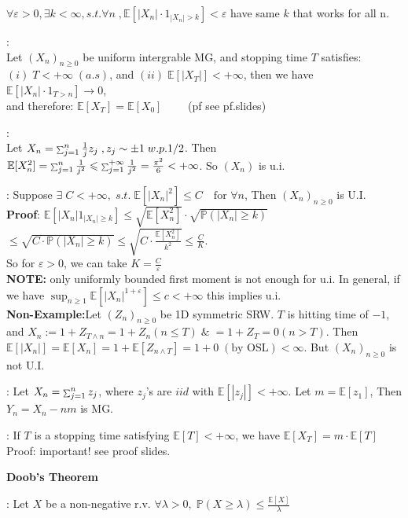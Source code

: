 \documentclass[a4paper, landscape]{article}
\newcommand{\topic}[1]{\par\medskip\textbf{#1}\par}
\newcommand{\subtopic}[1]{\par\textbf{#1}}
\newcommand{\smallsum}{\mathop{\scalebox{0.65}{$\sum$}}\nolimits}
\renewcommand{\topic}[1]{\par\medskip\noindent\colorbox{highlightcolor}{\parbox{\dimexpr\columnwidth-2\fboxsep\relax}{\textbf{#1}}}\par}
\renewcommand{\subtopic}[1]{\par\textbf{\color{blue}{#1}}} %
\begin{document}
\begin{multicols}{4}
$\forall\varepsilon>0,\exists k<\infty,s.t.\forall n\;,\mathbb E[|X_n| \cdot 1_{|X_n|>k}]<\varepsilon$ have same $k$ that works for all n.
\subtopic{Revised OST(u.i.)}:\\
Let $(X_n)_{n\geqslant0}$ be uniform intergrable MG, and stopping time $T$ satisfies: $(i)\;T<+\infty\;(a.s)$, and $(ii)\;\mathbb E[|X_T|]<+\infty$, then we have $\mathbb E[|X_n|\cdot1_{T>n}]\to 0$, \\and therefore: $\mathbb E[X_T]=\mathbb E[X_0]\qquad$ (pf see pf.slides)\\
\subtopic{An example of u.i.}:\\
Let $X_n=\smallsum_{j=1}^{n}\frac{1}{j}z_j\;,z_j\sim\pm1\;w.p.1/2$. Then $\mathbb E[X_n^2]=\smallsum_{j=1}^n\frac{1}{j^2}\leqslant\smallsum_{j=1}^{+\infty}\frac{1}{j^2}=\frac{\pi^2}{6}<+\infty$. So $(X_n)$ is u.i.
\subtopic{Equivalence U.I.}: Suppose $\exists\;C<+\infty,\;s.t.\; \mathbb E[|X_n|^2]\leqslant C\quad \text{for }\forall n$, Then $(X_n)_{n\geqslant0}$ is U.I.\\
\textbf{Proof}: $\mathbb E[|X_n|1_{|X_n|\geqslant k}]\leqslant\sqrt{\mathbb E[X_n^2]}\cdot\sqrt{\mathbb P(|X_n|\geqslant k)}$\\
$\leqslant\sqrt{C\cdot\mathbb P(|X_n|\geqslant k)}\leqslant\sqrt{C\cdot\frac{\mathbb E[X_n^2]}{k^2}}\leqslant\frac CK$.\\
So for $\varepsilon>0$, we can take $K=\frac{C}{\varepsilon}$
\\
\textbf{NOTE:} only uniformly bounded first moment is not enough for u.i. In general, if we have $\sup_{n\geqslant1}\mathbb E[|X_n|^{1+\varepsilon}]\leqslant c<+\infty$ this implies u.i.\\
\textbf{Non-Example:}Let $(Z_n)_{n\geqslant0}$ be 1D symmetric SRW. $T$ is hitting time of $-1$, and $X_n:=1+Z_{T\land n}=1+Z_n(n\leqslant T)\; \&\;=1+Z_T=0(n>T)$. Then $\mathbb E[|X_n|]=\mathbb E[X_n]=1+\mathbb E[Z_{n \land T}]=1+0\;(\text{by OSL})<\infty$. But $(X_n)_{n\geqslant0}$ is not U.I.
\subtopic{Wald Identity}: Let $X_n=\smallsum_{j=1}^nz_j$, where $z_j$'s are $iid$ with $\mathbb E[|z_j|]<+\infty$. Let $m=\mathbb E[z_1]$, Then $Y_n=X_n-nm$ is MG.
\subtopic{Wald Theorem}: If $T$ is a stopping time satisfying $\mathbb E[T]<+\infty$, we have $\mathbb E[X_T]=m\cdot\mathbb E[T]$\\
Proof: important! see proof slides.\vspace{0.5em}\\
\textbf{}
\topic{Doob's Theorem}
\subtopic{Recall Markov inequality}: Let $X$ be a non-negative r.v. $\forall \lambda>0, \;\mathbb P(X\geqslant\lambda)\leqslant\frac{\mathbb E[X]}{\lambda}$

\end{multicols}
\end{document}
